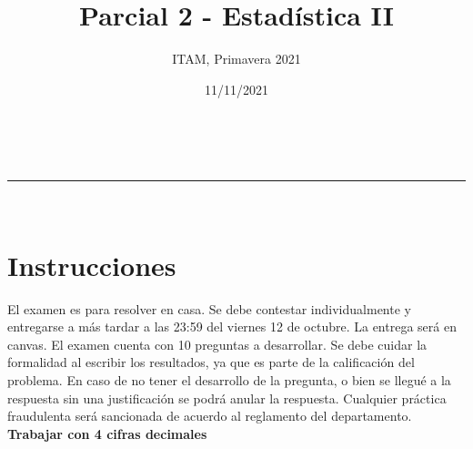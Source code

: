 \documentclass[addpoints]{exam}
\makeatletter
\newcommand{\linia}{\rule{\linewidth}{0.5pt}}
\theoremstyle{mytheor}
\renewcommand{\maketitle}{
    \begin{center}
    \vspace{2ex}
    {\huge \textsc{\@title}}
    \vspace{1ex}
    \\
    \linia\\
    \@author \hfill \@date
    \vspace{4ex}
    \end{center}
  }
\makeatother
\begin{document}
  
  \title{Parcial 2 - Estadística II}
  
  \author{ITAM, Primavera 2021}
  
  \date{11/11/2021}
  
  \maketitle
  
  \section*{Instrucciones}
  
El examen es para resolver en casa. Se debe contestar individualmente y entregarse a más tardar a las 23:59 del viernes 12 de octubre. La entrega será en canvas. El examen cuenta con 10 preguntas a desarrollar. Se debe cuidar la formalidad al escribir los resultados, ya que es parte de la calificación del problema. En caso de no tener el desarrollo de la pregunta, o bien se llegué a la respuesta sin una justificación se podrá anular la respuesta. Cualquier práctica fraudulenta será sancionada de acuerdo al reglamento del departamento. \textbf{Trabajar con 4 cifras decimales}

\vspace{10pt}
\end{document}
